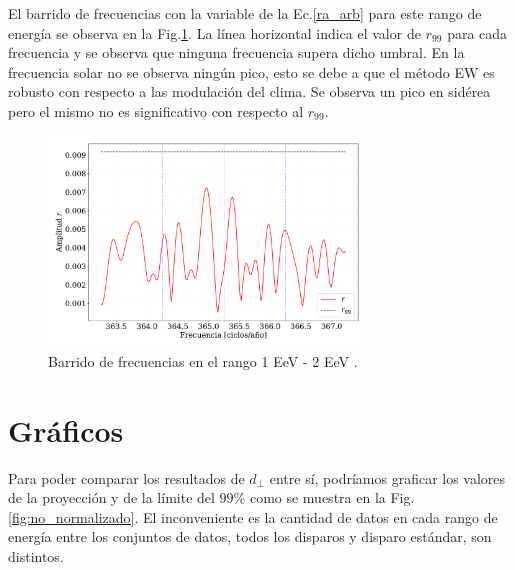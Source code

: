 \documentclass[11pt,papel,oneside,singlespace]{ibtesis}
\begin{document}
    El barrido de frecuencias con la variable de la Ec.\ref{ra_arb} para este rango de energía se observa en la Fig.\ref{fig:tercer_barrido}. La línea horizontal indica el valor de $r_{99}$ para cada frecuencia y se observa que ninguna frecuencia supera dicho umbral. En la frecuencia solar no se observa ningún pico, esto se debe a que el método EW es robusto con respecto a las modulación del clima. Se observa un pico en sidérea pero el mismo no es significativo con respecto al $r_{99}$.


    \begin{figure}[H]
        \begin{small}
            \begin{center}
                \includegraphics[width=0.75\textwidth]{plot_bin_3_barrido_v2.pdf}
            \end{center}
            \caption{Barrido de frecuencias en el rango 1 EeV - 2 EeV .}
            \label{fig:tercer_barrido}
        \end{small}
    \end{figure}    

    \section{Gráficos}

    Para poder comparar los resultados de $d_\perp$ entre sí, podríamos graficar los valores de la proyección y de la límite del $99\%$ como se muestra en la Fig.\ref{fig:no_normalizado}. El inconveniente es la cantidad de datos en cada rango de energía entre los conjuntos de datos, todos los disparos y disparo estándar, son distintos.
\end{document}
